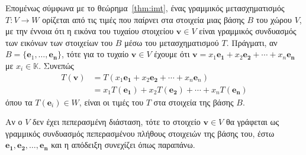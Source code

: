 \begin{rem}
  Επομένως σύμφωνα με το θεώρημα~\ref{thm:imt}, ένας γραμμικός μετασχηματισμός 
  $ T \colon V \to W $ ορίζεται από τις τιμές που παίρνει στα στοιχεία μιας βάσης 
  $ B $ του χώρου $V$, με την έννοια ότι η εικόνα του τυχαίου στοιχείου 
  $ \mathbf{v} \in V $ είναι γραμμικός συνδυασμός των εικόνων των στοιχείων του 
  $B$ μέσω του μετασχηματισμού $T$. 
  Πράγματι, αν
  $ B = \{ \mathbf{e}_{1}, \ldots, \mathbf{e_{n}} \} $, 
  τότε για το τυχαίο $ \mathbf{v} \in V $ έχουμε ότι 
  $ \mathbf{v}= x_{1} \mathbf{e_{1}} + x_{2} \mathbf{e_{2}} +  
  \cdots + x_{n} \mathbf{e_{n}} $ με $ x_{i} \in \mathbb{K} $. Συνεπώς
  \begin{align*}
    T(\mathbf{v}) & = T(x_{1} \mathbf{e_{1}}+ x_{2} \mathbf{e_{2}}+ \cdots + x_{n}
    \mathbf{e}_{n}) \\ 
                  &= x_{1}T(\mathbf{e_{1}}) + x_{2}T(\mathbf{e_{2}}) + \cdots + x_{n} 
                  T(\mathbf{e_{n}})
  \end{align*}
  όπου τα $ T(\mathbf{e}_{i}) \in W $, είναι οι τιμές του $T$ στα 
  στοιχεία της βάσης $B$.
\end{rem}

\begin{rem}
  Αν ο $V$ δεν έχει πεπερασμένη διάσταση, τότε το στοιχείο $ \mathbf{v} \in V $ 
  θα γράφεται ως γραμμικός συνδυασμός πεπερασμένου πλήθους στοιχειών της βάσης του, 
  έστω $ \mathbf{e_{1}}, \mathbf{e_{2}}, \ldots, \mathbf{e_{n}} $ και η απόδειξη 
  συνεχίζει όπως παραπάνω.
\end{rem}

